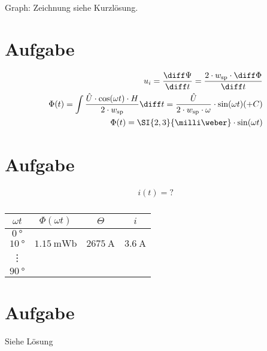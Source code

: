\documentclass[10pt,a4paper]{article}
\begin{document}
Graph: Zeichnung siehe Kurzlösung.

\section{Aufgabe}
\begin{align*}
u_i = \frac{\diff \Psi}{\diff t} = \frac{2\cdot w_\text{sp}\cdot \diff\Phi}{\diff t}\\
\Phi(t) = \int \frac{\hat{U}\cdot\cos(\omega t)\cdot H}{2\cdot w_\text{sp}} \diff t = \frac{\hat{U}}{2\cdot w_\text{sp}\cdot \omega} \cdot \sin(\omega t) (+C)\\
\Phi(t) = \SI{2,3}{\milli\weber} \cdot \sin(\omega t)
\end{align*}

\section{Aufgabe}
\begin{align*}
i(t) = ?\\
\end{align*}
\begin{center}
\begin{tabular}{c||c|c|c}
$\omega t$ & $\Phi(\omega t)$ & $\Theta$ & $i$ \\ 
\hline \hline
$\SI{0}{\degree}$ &  &  &  \\ 
\hline 
$\SI{10}{\degree}$ & $\SI{1,15}{\milli\weber}$ & $\SI{2675}{\ampere}$ & $\SI{3,6}{\ampere}$ \\ 
\hline 
\vdots &  &  &  \\ 
\hline 
$\SI{90}{\degree}$ & & &
\end{tabular} 
\end{center}

\section{Aufgabe}

Siehe Lösung
\end{document}
